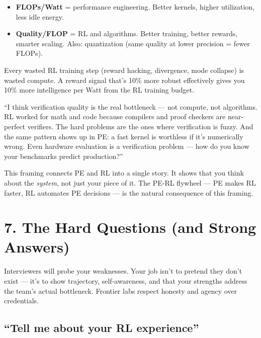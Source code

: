 \begin{itemize}
  \item \textbf{FLOPs/Watt} = performance engineering. Better kernels, higher utilization, less idle energy.
  \item \textbf{Quality/FLOP} = RL and algorithms. Better training, better rewards, smarter scaling. Also: quantization (same quality at lower precision = fewer FLOPs).
\end{itemize}

Every wasted RL training step (reward hacking, divergence, mode collapse) is wasted compute. A reward signal that's 10\% more robust effectively gives you 10\% more intelligence per Watt from the RL training budget.

\begin{sayit}
``I think verification quality is the real bottleneck --- not compute, not algorithms. RL worked for math and code because compilers and proof checkers are near-perfect verifiers. The hard problems are the ones where verification is fuzzy. And the same pattern shows up in PE: a fast kernel is worthless if it's numerically wrong. Even hardware evaluation is a verification problem --- how do you know your benchmarks predict production?''
\end{sayit}

\begin{whyanthro}
This framing connects PE and RL into a single story. It shows that you think about the \textit{system}, not just your piece of it. The PE-RL flywheel --- PE makes RL faster, RL automates PE decisions --- is the natural consequence of this framing.
\end{whyanthro}

\section{7. The Hard Questions (and Strong Answers)}

\begin{bluf}
Interviewers will probe your weaknesses. Your job isn't to pretend they don't exist --- it's to show trajectory, self-awareness, and that your strengths address the team's actual bottleneck. Frontier labs respect honesty and agency over credentials.
\end{bluf}

\subsection{``Tell me about your RL experience''}

